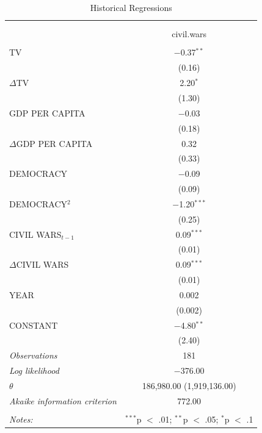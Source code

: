 \documentclass[11pt,article,oneside]{memoir}
\begin{document}
\begin{table}[!htbp] \centering 
  \caption{Historical Regressions} 
  \label{} 
\footnotesize 
\begin{tabular}{@{\extracolsep{5pt}}lc} 
\\[-1.8ex]\hline \\[-1.8ex] 
\\[-1.8ex] & civil.wars \\ 
\hline \\[-1.8ex] 
 TV & $-$0.37$^{**}$ \\ 
  & (0.16) \\ 
  $\Delta$TV & 2.20$^{*}$ \\ 
  & (1.30) \\ 
  GDP PER CAPITA & $-$0.03 \\ 
  & (0.18) \\ 
  $\Delta$GDP PER CAPITA & 0.32 \\ 
  & (0.33) \\ 
  DEMOCRACY & $-$0.09 \\ 
  & (0.09) \\ 
  DEMOCRACY$^2$ & $-$1.20$^{***}$ \\ 
  & (0.25) \\ 
  CIVIL WARS$_{t-1}$ & 0.09$^{***}$ \\ 
  & (0.01) \\ 
  $\Delta$CIVIL WARS & 0.09$^{***}$ \\ 
  & (0.01) \\ 
  YEAR & 0.002 \\ 
  & (0.002) \\ 
  CONSTANT & $-$4.80$^{**}$ \\ 
  & (2.40) \\ 
 \textit{Observations} & 181 \\ 
\textit{Log likelihood} & $-$376.00 \\ 
$\theta$ & 186,980.00  (1,919,136.00) \\ 
\textit{Akaike information criterion} & 772.00 \\ 
\hline \\[-1.8ex] 
\textit{Notes:} & \multicolumn{1}{l}{$^{***}$p $<$ .01; $^{**}$p $<$ .05; $^{*}$p $<$ .1} \\ 
\end{tabular} 
\end{table}
\end{document}
